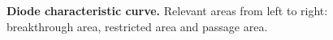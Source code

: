 {%


\begin{figure}[H]
    \renewcommand{\figurename}{Figure}
    \centering
    
    \caption{\textbf{Diode characteristic curve.} Relevant areas from left to right: breakthrough area, restricted area and passage area.}  
    \label{fig:Diodenkennlinie}
\end{figure}
}
